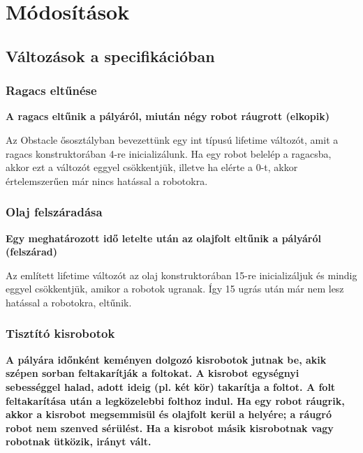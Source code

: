 %
\setcounter{chapter}{-1}
\chapter{Módosítások}

\section{Változások a specifikációban}

\subsection{Ragacs eltűnése}
\textbf{A ragacs eltűnik a pályáról, miután négy robot ráugrott (elkopik)}

Az Obstacle ősosztályban bevezettünk egy int típusú lifetime változót, amit a ragacs konstruktorában 4-re inicializálunk. Ha egy robot belelép a ragacsba, akkor ezt a változót eggyel csökkentjük, illetve ha elérte a 0-t, akkor értelemszerűen már nincs hatással a robotokra.

\subsection{Olaj felszáradása}
\textbf{Egy meghatározott idő letelte után az olajfolt eltűnik a pályáról (felszárad)}

Az említett lifetime változót az olaj konstruktorában 15-re inicializáljuk és mindig eggyel csökkentjük, amikor a robotok ugranak. Így 15 ugrás után már nem lesz hatással a robotokra, eltűnik.

\subsection{Tisztító kisrobotok}
\textbf{A pályára időnként keményen dolgozó kisrobotok jutnak be, akik szépen sorban feltakarítják a foltokat. A kisrobot egységnyi sebességgel halad, adott ideig (pl. két kör) takarítja a foltot. A folt feltakarítása után a legközelebbi folthoz indul. Ha egy robot ráugrik, akkor a kisrobot megsemmisül és olajfolt kerül a helyére; a ráugró robot nem szenved sérülést. Ha a kisrobot másik kisrobotnak vagy robotnak ütközik, irányt vált.}

